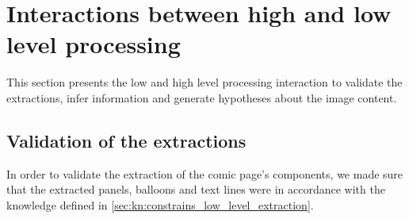 

\section{Interactions between high and low level processing}
\label{sec:kn:interaction_low_high_level_processing}


This section presents the low and high level processing interaction to validate the extractions, infer information and generate hypotheses about the image content.%
\subsection{Validation of the extractions} %
\label{sub:kn:validation}
In order to validate the extraction of the comic page's components, we made sure that the extracted panels, balloons and text lines were in accordance with the knowledge defined in \ref{sec:kn:constrains_low_level_extraction}.


